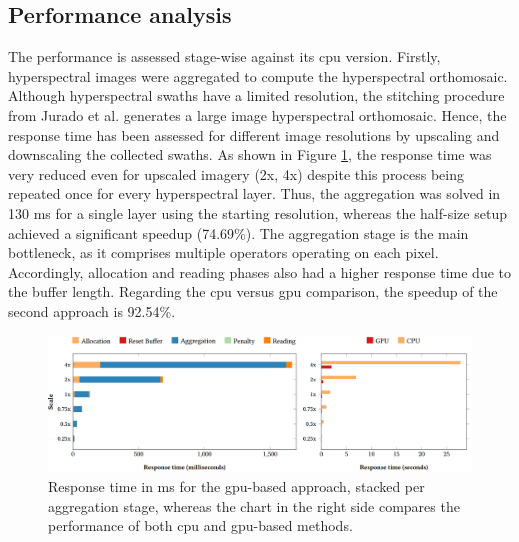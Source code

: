\subsection{Performance analysis}

The performance is assessed stage-wise against its \acrshort{cpu} version. Firstly, hyperspectral images were aggregated to compute the hyperspectral orthomosaic. Although hyperspectral swaths have a limited resolution, the stitching procedure from Jurado et al. \cite{jurado_efficient_2022} generates a large image hyperspectral orthomosaic. Hence, the response time has been assessed for different image resolutions by upscaling and downscaling the collected swaths. As shown in Figure \ref{fig:hyper_aggregation_results}, the response time was very reduced even for upscaled imagery (2x, 4x) despite this process being repeated once for every hyperspectral layer. Thus, the aggregation was solved in 130 \si{\milli\second} for a single layer using the starting resolution, whereas the half-size setup achieved a significant speedup (74.69\%). The aggregation stage is the main bottleneck, as it comprises multiple operators operating on each pixel. Accordingly, allocation and reading phases also had a higher response time due to the buffer length. Regarding the \acrshort{cpu} versus \acrshort{gpu} comparison, the speedup of the second approach is 92.54\%.

\begin{figure}[bt]
    \centering
    \includegraphics[width=\linewidth]{figs/hyper_point_cloud/hyper_aggregation_performance.png}
    \caption{Response time in \si{\milli\second} for the \acrshort{gpu}-based approach, stacked per aggregation stage, whereas the chart in the right side compares the performance of both \acrshort{cpu} and \acrshort{gpu}-based methods.}
    \label{fig:hyper_aggregation_results}
\end{figure}


